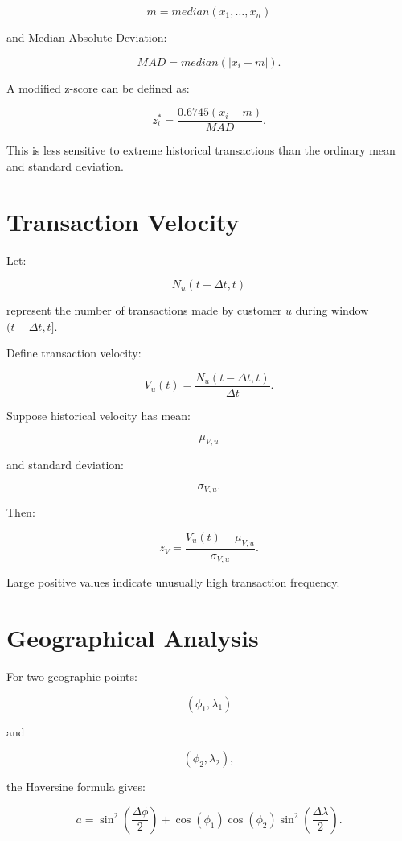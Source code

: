 \documentclass[11pt,a4paper]{article}
\begin{document}
\[
m = median(x_1,\ldots,x_n)
\]

and Median Absolute Deviation:

\[
MAD
=
median(|x_i-m|).
\]

A modified z-score can be defined as:

\[
z_i^{*}
=
\frac{0.6745(x_i-m)}{MAD}.
\]

This is less sensitive to extreme historical transactions than the
ordinary mean and standard deviation.

\section{Transaction Velocity}

Let:

\[
N_u(t-\Delta t,t)
\]

represent the number of transactions made by customer \(u\) during
window \((t-\Delta t,t]\).

Define transaction velocity:

\[
V_u(t)
=
\frac{N_u(t-\Delta t,t)}{\Delta t}.
\]

Suppose historical velocity has mean:

\[
\mu_{V,u}
\]

and standard deviation:

\[
\sigma_{V,u}.
\]

Then:

\[
z_V
=
\frac{V_u(t)-\mu_{V,u}}
{\sigma_{V,u}}.
\]

Large positive values indicate unusually high transaction frequency.

\section{Geographical Analysis}

For two geographic points:

\[
(\phi_1,\lambda_1)
\]

and

\[
(\phi_2,\lambda_2),
\]

the Haversine formula gives:

\[
a
=
\sin^2
\left(
\frac{\Delta\phi}{2}
\right)
+
\cos(\phi_1)
\cos(\phi_2)
\sin^2
\left(
\frac{\Delta\lambda}{2}
\right).
\]
\end{document}
